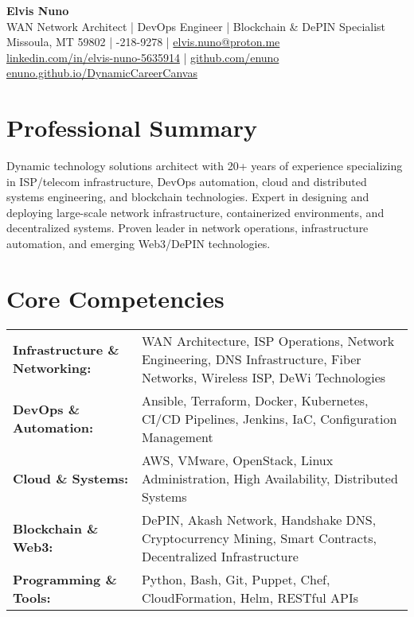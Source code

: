 \documentclass[11pt,a4paper]{article}
\begin{document}
\begin{center}
    \textbf{\LARGE Elvis Nuno}\\
    \vspace{0.5em}
    WAN Network Architect | DevOps Engineer | Blockchain \& DePIN Specialist\\
    \vspace{0.5em}
    \small
    Missoula, MT 59802 \quad | -218-9278 \quad | \quad \href{mailto:elvis.nuno@proton.me}{elvis.nuno@proton.me} \\
    \href{https://www.linkedin.com/in/elvis-nuno-5635914}{linkedin.com/in/elvis-nuno-5635914} \quad | \quad \href{https://github.com/enuno}{github.com/enuno} \\
    \href{https://enuno.github.io/DynamicCareerCanvas/}{enuno.github.io/DynamicCareerCanvas}
\end{center}

\vspace{1em}

\section*{Professional Summary}
Dynamic technology solutions architect with 20+ years of experience specializing in ISP/telecom infrastructure, DevOps automation, cloud and distributed systems engineering, and blockchain technologies. Expert in designing and deploying large-scale network infrastructure, containerized environments, and decentralized systems. Proven leader in network operations, infrastructure automation, and emerging Web3/DePIN technologies.

\section*{Core Competencies}
\begin{tabular}{p{} p{}}
\textbf{Infrastructure \& Networking:} & WAN Architecture, ISP Operations, Network Engineering, DNS Infrastructure, Fiber Networks, Wireless ISP, DeWi Technologies \\
\textbf{DevOps \& Automation:} & Ansible, Terraform, Docker, Kubernetes, CI/CD Pipelines, Jenkins, IaC, Configuration Management \\
\textbf{Cloud \& Systems:} & AWS, VMware, OpenStack, Linux Administration, High Availability, Distributed Systems \\
\textbf{Blockchain \& Web3:} & DePIN, Akash Network, Handshake DNS, Cryptocurrency Mining, Smart Contracts, Decentralized Infrastructure \\
\textbf{Programming \& Tools:} & Python, Bash, Git, Puppet, Chef, CloudFormation, Helm, RESTful APIs \\
\end{tabular}
\end{document}
